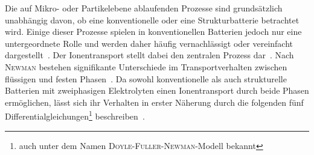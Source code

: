 Die auf Mikro- oder Partikelebene ablaufenden Prozesse sind grundsätzlich unabhängig davon, ob eine konventionelle oder eine Strukturbatterie betrachtet wird. Einige dieser Prozesse spielen in konventionellen Batterien jedoch nur eine untergeordnete Rolle und werden daher häufig vernachlässigt oder vereinfacht dargestellt~\cite{Carlstedt2020a}. Der Ionentransport stellt dabei den zentralen Prozess dar~\cite{Carlstedt2019b}. Nach \textsc{Newman} bestehen signifikante Unterschiede im Transportverhalten zwischen flüssigen und festen Phasen~\cite{Newman2021}. Da sowohl konventionelle als auch strukturelle Batterien mit zweiphasigen Elektrolyten einen Ionentransport durch beide Phasen ermöglichen, lässt sich ihr Verhalten in erster Näherung durch die folgenden fünf Differentialgleichungen\footnote{auch unter dem Namen \textsc{Doyle}-\textsc{Fuller}-\textsc{Newman}-Modell bekannt} beschreiben~\cite{Plett2015}.

